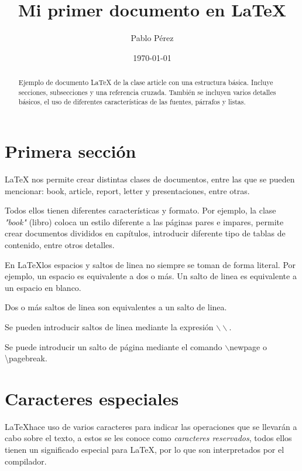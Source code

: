 \documentclass[letterpaper,11pt]{article}
\title{Mi primer documento en \LaTeX{}}
\author{Pablo Pérez}
\date{\today{}}
\begin{document}
\thispagestyle{empty}

\maketitle

\tableofcontents

\newpage

\begin{abstract}
Ejemplo de documento \LaTeX{} de la clase {\ttfamily article} con una estructura básica. 
Incluye secciones, subsecciones y una referencia cruzada. También se incluyen varios detalles básicos, el uso de diferentes características de las fuentes, párrafos y listas.
\end{abstract}

\section{Primera sección}\label{primera}

\LaTeX{} nos permite crear distintas clases de documentos, entre las que se pueden mencionar: book, article, report, letter y presentaciones, entre otras.

Todos ellos tienen diferentes características y formato. Por ejemplo, la clase \textit{"book"} (libro) coloca un estilo diferente a las páginas pares e impares, permite crear documentos divididos en capítulos, introducir diferente  tipo de tablas de contenido, entre otros detalles.





En \LaTeX los espacios y saltos de linea no siempre se toman de forma literal.
Por ejemplo, un espacio        es      equivalente a      dos o más. 
Un salto de linea es equivalente a un espacio en blanco.

Dos o más saltos de linea son equivalentes a un salto de linea.

Se pueden introducir saltos de linea mediante la expresión $\backslash\backslash$.

Se puede introducir un salto de página mediante el comando $\backslash$newpage o \textbackslash pagebreak.

\section{Caracteres especiales}

\LaTeX hace uso de varios caracteres para indicar las operaciones que se llevarán a cabo sobre el texto, a estos se les conoce como \emph{caracteres reservados}, todos ellos tienen un significado especial para \LaTeX, por lo que son interpretados por el compilador.
\end{document}
